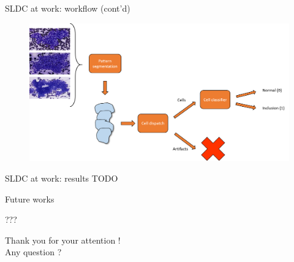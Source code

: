 \documentclass{beamer}
\begin{document}
\begin{frame}{SLDC at work: workflow (cont'd)}
	\begin{figure}
		\includegraphics[scale=0.4]{images/thyroid_workflow_2.png}
	\end{figure}
\end{frame}

\begin{frame}{SLDC at work: results}
	TODO
\end{frame}


\begin{frame}{Future works}

???

\end{frame}


\begin{frame}
	\vfill
	\begin{center}
		Thank you for your attention ! \\
		Any question ?
	\end{center}
	\vfill
\end{frame}
\end{document}
